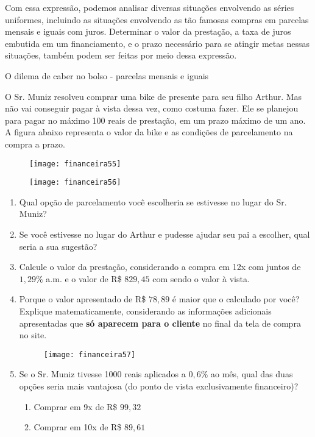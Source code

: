 Com essa expressão, podemos analisar diversas situações envolvendo as séries uniformes, incluindo as situações envolvendo as tão famosas compras em parcelas mensais e iguais com juros. Determinar o valor da prestação, a taxa de juros embutida em um financiamento, e o prazo necessário para se atingir metas nessas situações, também podem ser feitas por meio dessa expressão.



\begin{task}{O dilema de caber no bolso - parcelas mensais e iguais}
\label{fin-ativ-22}

O Sr. Muniz resolveu comprar uma bike de presente para seu filho Arthur. Mas não vai conseguir pagar à vista dessa vez, como costuma fazer. Ele se planejou para pagar no máximo 100 reais de prestação, em um prazo máximo de um ano. A figura abaixo representa o valor da bike e as condições de parcelamento na compra a prazo.


\begin{figure}[H]
\centering

\texttt{[image: financeira55]}
\end{figure}

\begin{figure}[H]
\centering

\texttt{[image: financeira56]}
\end{figure}

\begin{enumerate}
\item Qual opção de parcelamento você escolheria se estivesse no lugar do Sr. Muniz?
\item Se você estivesse no lugar do Arthur e pudesse ajudar seu pai a escolher, qual seria a sua sugestão?
\item Calcule o valor da prestação, considerando a compra em 12x com juntos de $1{,}29\%$ a.m. e o valor de R\$ $829{,}45$ com sendo o valor à vista. 
\item Porque o valor apresentado de R\$ $78{,}89$ é maior que o calculado por você? Explique matematicamente, considerando as informações adicionais apresentadas que \textbf{só aparecem para o cliente} no final da tela de compra no site.

\begin{figure}[H]
\centering

\texttt{[image: financeira57]}
\end{figure}

\item Se o Sr. Muniz tivesse 1000 reais aplicados a $0{,}6\%$ ao mês, qual das duas opções seria mais vantajosa (do ponto de vista exclusivamente financeiro)?

\begin{enumerate}[label=\Roman* -]
\item Comprar em 9x de R\$ $99{,}32$
\item Comprar em 10x de R\$ $89{,}61$
\end{enumerate}
\end{enumerate}
\end{task}

